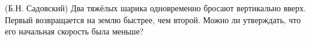 (Б.Н. Садовский)
Два тяжёлых шарика одновременно бросают вертикально вверх. Первый
возвращается на землю быстрее, чем второй. Можно ли утверждать, что
его начальная скорость была меньше?
